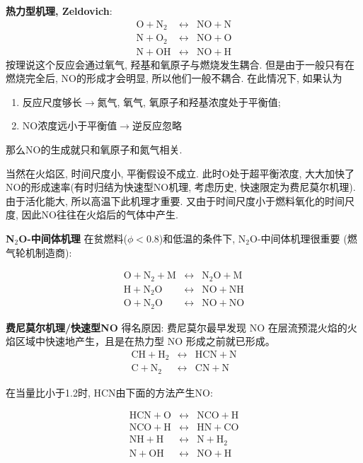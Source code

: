 \textbf{热力型机理, Zeldovich}:
\begin{eqnarray}
    \mathrm{O+N_2} &\leftrightarrow& \mathrm{NO + N}\\
    \mathrm{N+O_2} &\leftrightarrow& \mathrm{NO + O}\\
    \mathrm{N+OH} &\leftrightarrow& \mathrm{NO + H}
\end{eqnarray}
按理说这个反应会通过氧气, 羟基和氧原子与燃烧发生耦合. 但是由于一般只有在燃烧完全后, NO的形成才会明显, 所以他们一般不耦合. 在此情况下, 如果认为
\begin{enumerate}
    \item 反应尺度够长\(\to\)氮气, 氧气, 氧原子和羟基浓度处于平衡值;
    \item NO浓度远小于平衡值\(\to\)逆反应忽略
\end{enumerate}

那么NO的生成就只和氧原子和氮气相关.

当然在火焰区, 时间尺度小, 平衡假设不成立. 此时O处于超平衡浓度, 大大加快了NO的形成速率(有时归结为快速型NO机理, 考虑历史, 快速限定为费尼莫尔机理).
由于活化能大, 所以高温下此机理才重要. 又由于时间尺度小于燃料氧化的时间尺度, 因此NO往往在火焰后的气体中产生.

\textbf{N\(_2\)O-中间体机理}
在贫燃料(\(\phi<0.8\))和低温的条件下, N\(_2\)O-中间体机理很重要 (燃气轮机制造商):

\begin{eqnarray}
    \mathrm{O + N_2 + M} &\leftrightarrow& \mathrm{N_2O + M}\\
    \mathrm{H + N_2O} &\leftrightarrow& \mathrm{NO + NH}\\
    \mathrm{O + N_2O} &\leftrightarrow& \mathrm{NO + NO}
\end{eqnarray}


\textbf{费尼莫尔机理/快速型NO}
得名原因: 费尼莫尔最早发现 NO 在层流预混火焰的火焰区域中快速地产生，且是在热力型 NO 形成之前就已形成。
\begin{eqnarray}
    \mathrm{CH + H_2} &\leftrightarrow& \mathrm{HCN + N}\\
    \mathrm{C + N_2} &\leftrightarrow& \mathrm{CN + N}
\end{eqnarray}

在当量比小于1.2时, HCN由下面的方法产生NO:

\begin{eqnarray}
    \mathrm{HCN + O} &\leftrightarrow& \mathrm{NCO + H} \\
    \mathrm{NCO + H} &\leftrightarrow& \mathrm{HN + CO} \\
    \mathrm{NH + H} &\leftrightarrow& \mathrm{N + H_2} \\
    \mathrm{N + OH} &\leftrightarrow& \mathrm{NO + H}
\end{eqnarray}

